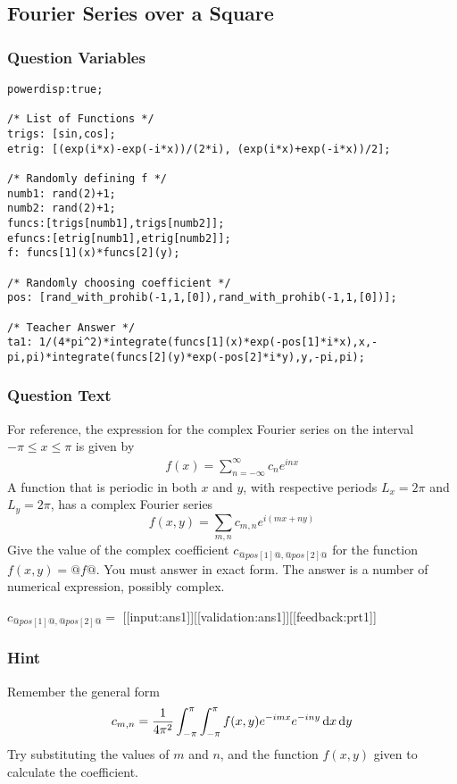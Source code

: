 \documentclass[a4paper,10pt]{article}
\begin{document}
\subsection{Fourier Series over a Square}
\subsubsection{Question Variables}
\begin{lstlisting}
powerdisp:true;

/* List of Functions */
trigs: [sin,cos];
etrig: [(exp(i*x)-exp(-i*x))/(2*i), (exp(i*x)+exp(-i*x))/2];

/* Randomly defining f */
numb1: rand(2)+1;
numb2: rand(2)+1;
funcs:[trigs[numb1],trigs[numb2]];
efuncs:[etrig[numb1],etrig[numb2]];
f: funcs[1](x)*funcs[2](y);

/* Randomly choosing coefficient */
pos: [rand_with_prohib(-1,1,[0]),rand_with_prohib(-1,1,[0])];

/* Teacher Answer */
ta1: 1/(4*pi^2)*integrate(funcs[1](x)*exp(-pos[1]*i*x),x,-pi,pi)*integrate(funcs[2](y)*exp(-pos[2]*i*y),y,-pi,pi);
\end{lstlisting}
\subsubsection{Question Text}
For reference, the expression for the complex Fourier series on the interval $-\pi \leq x \leq \pi$ is given by \begin{align*}
f(x) = \sum_{n=-\infty}^{\infty}c_ne^{inx}
\end{align*}
A function that is periodic in both \(x\) and \(y\), with respective periods \(L_x=2\pi\) and \(L_y=2\pi\), has a complex Fourier series \[ f(x,y) = \sum_{m,n}c_{m,n}e^{i(mx+ny)} \] Give the value of the complex coefficient \(c_{@pos[1]@,@pos[2]@}\) for the function \(f(x,y)=@f@\). You must answer in exact form. The answer is a number of numerical expression, possibly complex.

\(c_{@pos[1]@,@pos[2]@} = \) [[input:ans1]][[validation:ans1]][[feedback:prt1]]
\subsubsection{Hint}
Remember the general form \[ c_{m,n} = {1 \over 4 \pi^2} \int_{-\pi}^\pi \int_{-\pi}^\pi f(x,y) e^{-imx}e^{-iny}\, \text{d}x \, \text{d}y \]Try substituting the values of \(m\) and \(n\), and the function \(f(x,y)\) given to calculate the coefficient.
\end{document}
